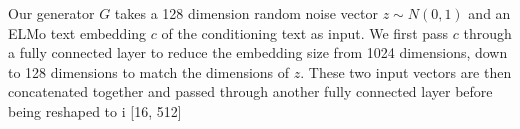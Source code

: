 Our generator $G$ takes a 128 dimension random noise vector $z \sim N(0, 1)$ and an ELMo text embedding $c$ of the conditioning text as input. We first pass $c$ through a fully connected layer to reduce the embedding size from 1024 dimensions, down to 128 dimensions to match the dimensions of $z$. These two input vectors are then concatenated together and passed through another fully connected layer before being reshaped to i [16, 512]